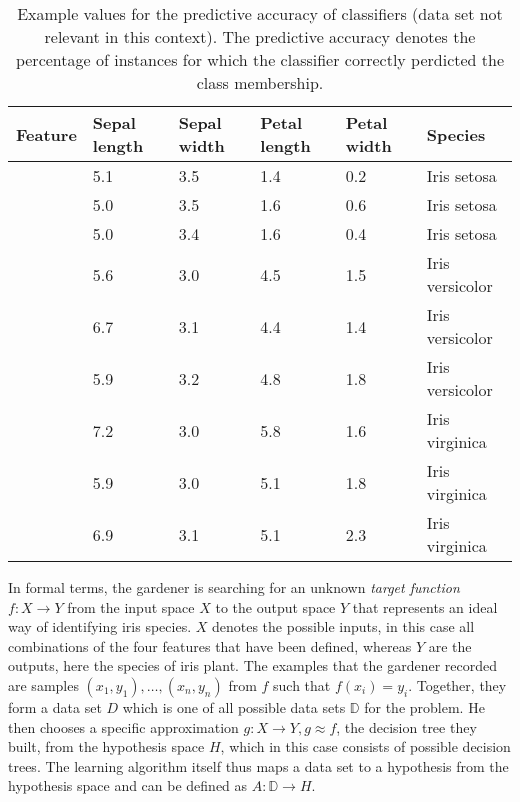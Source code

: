 \begin{table}[h]
	\begin{tabularx}{\textwidth}{X X X X X X}
		Feature	& Sepal length	& Sepal width	& Petal length	& Petal width 	& Species			\\ \hline
				& 5.1			& 3.5			& 1.4			& 0.2			& Iris setosa		\\ 
				& 5.0			& 3.5			& 1.6			& 0.6			& Iris setosa		\\ 
				& 5.0			& 3.4			& 1.6			& 0.4			& Iris setosa		\\ 
				& 5.6			& 3.0			& 4.5			& 1.5			& Iris versicolor	\\ 				
				& 6.7			& 3.1			& 4.4			& 1.4			& Iris versicolor	\\ 	
				& 5.9			& 3.2			& 4.8			& 1.8			& Iris versicolor	\\ 	
				& 7.2			& 3.0			& 5.8			& 1.6			& Iris virginica		\\ 	
				& 5.9			& 3.0			& 5.1			& 1.8			& Iris virginica		\\ 
				& 6.9			& 3.1			& 5.1			& 2.3			& Iris virginica		\\ 	
	\end{tabularx}
	\label{tab:iris}
	\caption{Example values for the predictive accuracy of classifiers (data set not relevant in this context). The predictive accuracy denotes the percentage of instances for which the classifier correctly perdicted the class membership.}
\end{table}

In formal terms, the gardener is searching for an unknown \textit{target function} $f:X \rightarrow Y$ from the input space $X$ to the output space $Y$ that represents an ideal way of identifying iris species. $X$ denotes the possible inputs, in this case all combinations of the four features that have been defined, whereas $Y$ are the outputs, here the species of iris plant. The examples that the gardener recorded are samples $(x_1,y_1),\dots,(x_n,y_n)$ from $f$ such that $f(x_i)=y_i$. Together, they form a data set $D$ which is one of all possible data sets $\mathbb{D}$ for the problem. He then chooses a specific approximation $g:X \rightarrow Y,g\approx f$, the decision tree they built, from the hypothesis space $H$, which in this case consists of possible decision trees. The learning algorithm itself thus maps a data set to a hypothesis from the hypothesis space and can be defined as $A:\mathbb{D}\rightarrow H$.



